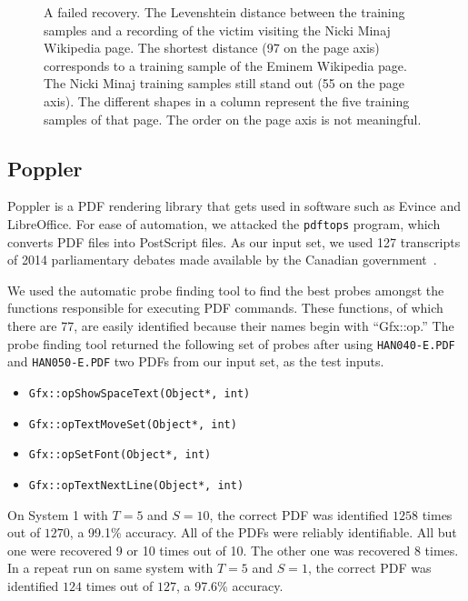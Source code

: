 \documentclass[letterpaper,twocolumn,10pt]{article}
\begin{document}
\begin{figure*}
    \centering
    
    \caption{A failed recovery. The Levenshtein distance between the training samples and
        a recording of the victim visiting the Nicki Minaj Wikipedia page. The
        shortest distance (97 on the page axis) corresponds to a training sample
        of the Eminem Wikipedia page. The Nicki Minaj training samples still
        stand out (55 on the page axis). The different shapes in a column
        represent the five training samples of that page. The order on the page
        axis is not meaningful.}
    \label{figure:minaj}
\end{figure*}

\subsection{Poppler}

Poppler is a PDF rendering library that gets used in software such as Evince and
LibreOffice. For ease of automation, we attacked the \texttt{pdftops} program,
which converts PDF files into PostScript files. As our input set, we used 127
transcripts of 2014 parliamentary debates made available by the Canadian
government~\cite{hansard}.

We used the automatic probe finding tool to find the best probes amongst the
functions responsible for executing PDF commands. These functions, of which
there are 77, are easily identified because their names begin with ``Gfx::op.''
The probe finding tool returned the following set of probes after using
\texttt{HAN040-E.PDF} and \texttt{HAN050-E.PDF} two PDFs from our input set, as
the test inputs.

\begin{itemize}
    \item \texttt{Gfx::opShowSpaceText(Object*, int)}
    \item \texttt{Gfx::opTextMoveSet(Object*, int)}
    \item \texttt{Gfx::opSetFont(Object*, int)}
    \item \texttt{Gfx::opTextNextLine(Object*, int)}
\end{itemize}

On System 1 with $T=5$ and $S=10$, the correct PDF was
identified $1258$ times out of $1270$, a 99.1\% accuracy. All of the PDFs were
reliably identifiable. All but one were recovered 9 or 10 times out of 10. The
other one was recovered 8 times. In a repeat run on same system with $T=5$ and
$S=1$, the correct PDF was identified $124$ times out of
$127$, a 97.6\% accuracy.
\end{document}
